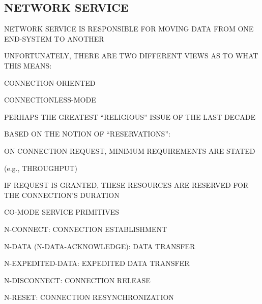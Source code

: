 \begin{bwslide}
\part*	{NETWORK SERVICE}\bf

\begin{nrtc}
\item	NETWORK SERVICE IS RESPONSIBLE FOR MOVING DATA FROM ONE END-SYSTEM
	TO ANOTHER

\item	UNFORTUNATELY, THERE ARE TWO DIFFERENT VIEWS AS TO WHAT THIS MEANS:
    \begin{nrtc}
    \item	CONNECTION-ORIENTED

    \item	CONNECTIONLESS-MODE
    \end{nrtc}

\item	PERHAPS THE GREATEST ``RELIGIOUS'' ISSUE OF THE LAST DECADE
\end{nrtc}
\end{bwslide}


\begin{bwslide}

\begin{nrtc}
\item	BASED ON THE NOTION OF ``RESERVATIONS'':
    \begin{nrtc}
    \item	ON CONNECTION REQUEST, MINIMUM REQUIREMENTS ARE STATED
	\begin{nrtc}
	\item	(e.g., THROUGHPUT)
	\end{nrtc}

    \item	IF REQUEST IS GRANTED, THESE RESOURCES ARE RESERVED FOR THE
		CONNECTION'S DURATION
    \end{nrtc}

\item	CO-MODE SERVICE PRIMITIVES
    \begin{nrtc}
    \item	N-CONNECT: CONNECTION ESTABLISHMENT

    \item	N-DATA (N-DATA-ACKNOWLEDGE): DATA TRANSFER 

    \item	N-EXPEDITED-DATA: EXPEDITED DATA TRANSFER

    \item	N-DISCONNECT: CONNECTION RELEASE

    \item	N-RESET: CONNECTION RESYNCHRONIZATION
    \end{nrtc}
\end{nrtc}
\end{bwslide}


